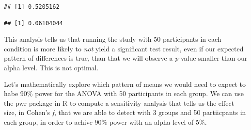 \documentclass[
]{book}
\newenvironment{Shaded}{\begin{snugshade}}{\end{snugshade}}
\newcommand{\CommentTok}[1]{\textcolor[rgb]{0.56,0.35,0.01}{\textit{#1}}}
\newcommand{\DataTypeTok}[1]{\textcolor[rgb]{0.13,0.29,0.53}{#1}}
\newcommand{\DecValTok}[1]{\textcolor[rgb]{0.00,0.00,0.81}{#1}}
\newcommand{\FloatTok}[1]{\textcolor[rgb]{0.00,0.00,0.81}{#1}}
\newcommand{\KeywordTok}[1]{\textcolor[rgb]{0.13,0.29,0.53}{\textbf{#1}}}
\newcommand{\NormalTok}[1]{#1}
\newcommand{\OperatorTok}[1]{\textcolor[rgb]{0.81,0.36,0.00}{\textbf{#1}}}
\newcommand{\StringTok}[1]{\textcolor[rgb]{0.31,0.60,0.02}{#1}}
\begin{document}
\begin{verbatim}
## [1] 0.5205162
\end{verbatim}

\begin{Shaded}
\end{Shaded}

\begin{verbatim}
## [1] 0.06104044
\end{verbatim}

This analysis tells us that running the study with 50 participants in each condition is more likely to \emph{not} yield a significant test result, even if our expected pattern of differences is true, than that we will observe a \emph{p}-value smaller than our alpha level. This is not optimal.

Let's mathematically explore which pattern of means we would need to expect to habe 90\% power for the ANOVA with 50 participants in each group. We can use the pwr package in R to compute a sensitivity analysis that tells us the effect size, in Cohen's \emph{f}, that we are able to detect with 3 groups and 50 partiicpants in each group, in order to achive 90\% power with an alpha level of 5\%.

\begin{Shaded}
\end{Shaded}
\end{document}
